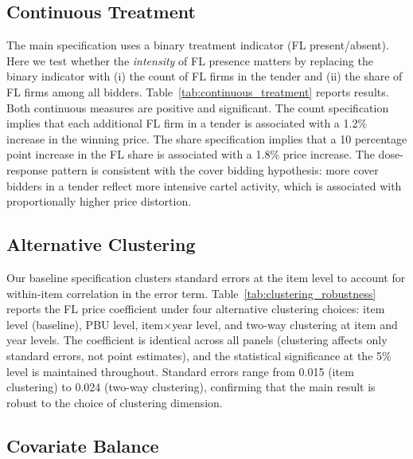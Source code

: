 

\subsection{Continuous Treatment}

The main specification uses a binary treatment indicator (FL present/absent). Here we test whether the \textit{intensity} of FL presence matters by replacing the binary indicator with (i) the count of FL firms in the tender and (ii) the share of FL firms among all bidders. Table~\ref{tab:continuous_treatment} reports results. Both continuous measures are positive and significant. The count specification implies that each additional FL firm in a tender is associated with a 1.2\% increase in the winning price. The share specification implies that a 10 percentage point increase in the FL share is associated with a 1.8\% price increase. The dose-response pattern is consistent with the cover bidding hypothesis: more cover bidders in a tender reflect more intensive cartel activity, which is associated with proportionally higher price distortion.



\subsection{Alternative Clustering}

Our baseline specification clusters standard errors at the item level to account for within-item correlation in the error term. Table~\ref{tab:clustering_robustness} reports the FL price coefficient under four alternative clustering choices: item level (baseline), PBU level, item$\times$year level, and two-way clustering at item and year levels. The coefficient is identical across all panels (clustering affects only standard errors, not point estimates), and the statistical significance at the 5\% level is maintained throughout. Standard errors range from 0.015 (item clustering) to 0.024 (two-way clustering), confirming that the main result is robust to the choice of clustering dimension.



\subsection{Covariate Balance}

